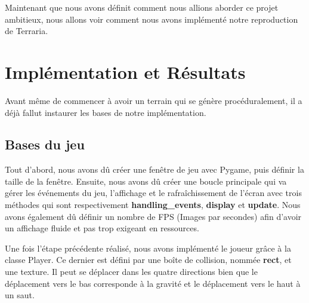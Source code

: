 \documentclass{article}
\begin{document}
Maintenant que nous avons définit comment nous allions aborder ce projet ambitieux, nous allons voir comment nous avons implémenté notre reproduction de Terraria.
\section{Implémentation et Résultats}
\label{Implémentation}

Avant même de commencer à avoir un terrain qui se génère procéduralement, il a déjà fallut instaurer les bases de notre implémentation.

\subsection{Bases du jeu}
  Tout d'abord, nous avons dû créer une fenêtre de jeu avec Pygame, puis définir la taille de la fenêtre. Ensuite, nous avons dû créer une boucle principale qui va gérer les événements du jeu, l'affichage et le rafraîchissement de l'écran avec trois méthodes qui sont respectivement \textbf{handling\_events}, \textbf{display} et \textbf{update}. Nous avons également dû définir un nombre de FPS (Images par secondes) afin d'avoir un affichage fluide et pas trop exigeant en ressources.\par
Une fois l'étape précédente réalisé, nous avons implémenté le joueur grâce à la classe Player. Ce dernier est défini par une boîte de collision, nommée \textbf{rect}, et une texture. Il peut se déplacer dans les quatre directions bien que le déplacement vers le bas corresponde à la gravité et le déplacement vers le haut à un saut.\par
\end{document}
